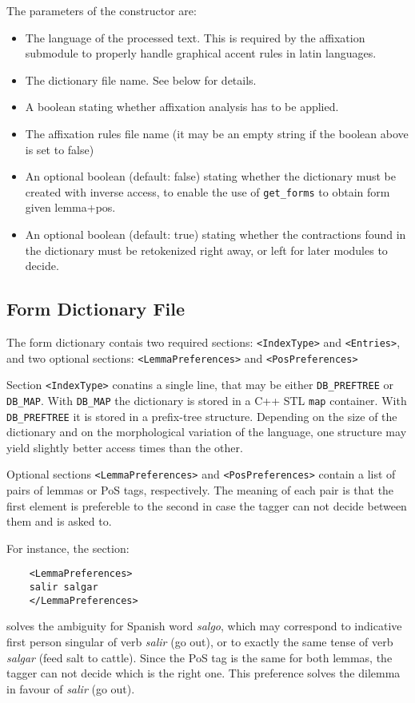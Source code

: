\documentclass[a4paper]{book}
\begin{document}
   The parameters of the constructor are:
\begin{itemize}
 \item The language of the processed text. This is required by the
   affixation submodule to properly handle graphical accent rules in
   latin languages.
 \item The dictionary file name. See below for details.
 \item A boolean stating whether affixation analysis has to be
   applied.
 \item The affixation rules file name (it may be an empty string if
   the boolean above is set to false)
 \item An optional boolean (default: false) stating whether the dictionary
   must be created with inverse access, to enable the use of \verb#get_forms# 
   to obtain form given lemma+pos.
 \item An optional boolean (default: true) stating whether the contractions found
   in the dictionary must be retokenized right away, or left for later modules to
   decide.
 \end{itemize}

\subsection{Form Dictionary File}

  The form dictionary contais two required sections:
  \verb#<IndexType># and \verb#<Entries>#, and two optional sections:
  \verb#<LemmaPreferences># and \verb#<PosPreferences>#

  Section \verb#<IndexType># conatins a single line, that may be either
  \verb#DB_PREFTREE# or \verb#DB_MAP#.  With \verb#DB_MAP# the dictionary is
  stored in a C++ STL \texttt{map} container. With \verb#DB_PREFTREE#
  it is stored in a prefix-tree structure.
  Depending on the size of the dictionary and on the morphological
  variation of the language, one structure may yield slightly better
  access times than the other.

  Optional sections \verb#<LemmaPreferences># and
  \verb#<PosPreferences># contain a list of pairs of lemmas or PoS
  tags, respectively.
  The meaning of each pair is that the first element is prefereble to
  the second in case the tagger can not decide between them and is asked to.

  For instance, the section:
  \begin{verbatim}
    <LemmaPreferences>
    salir salgar
    </LemmaPreferences>
  \end{verbatim}
  solves the ambiguity for Spanish word \textsl{salgo}, which may correspond to 
  indicative first person singular of verb \textsl{salir} (go out), or to exactly the
  same tense of verb \textsl{salgar} (feed salt to cattle). 
  Since the PoS tag is the same for both lemmas, the tagger can not decide which is
  the right one. This preference solves the dilemma in favour of \textsl{salir} (go out).
\end{document}
